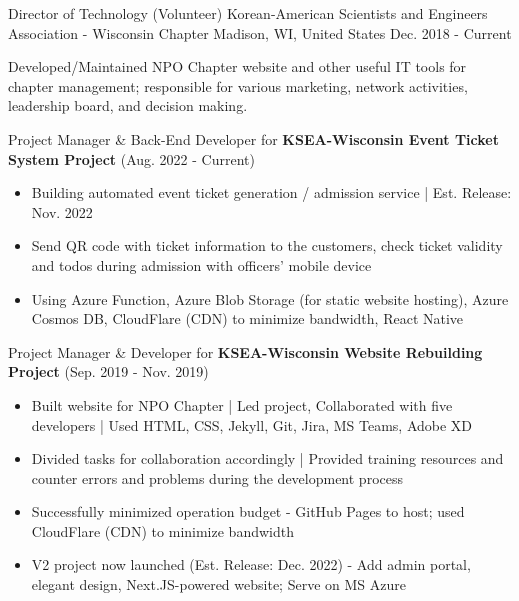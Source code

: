 

\begin{cventries}

  \cventry
  {Director of Technology (Volunteer)} %
  {Korean-American Scientists and Engineers Association - Wisconsin Chapter} %
  {Madison, WI, United States} %
  {Dec. 2018 - Current} %
  {
    \begin{cvitems} %
      \item {Developed/Maintained NPO Chapter website and other useful IT tools for chapter management; responsible for various marketing, network activities, leadership board, and decision making.}
      \item {Project Manager \& Back-End Developer for \textbf{KSEA-Wisconsin Event Ticket System Project} (Aug. 2022 - Current)}
      \begin{itemize}[label={}]
        \setlength{\itemindent}{-20pt}
        \item {Building automated event ticket generation / admission service | Est. Release: Nov. 2022}
        \item {Send QR code with ticket information to the customers, check ticket validity and todos during admission with officers' mobile device}
        \item {Using Azure Function, Azure Blob Storage (for static website hosting), Azure Cosmos DB, CloudFlare (CDN) to minimize bandwidth, React Native}
      \end{itemize}
      \item {Project Manager \& Developer for \textbf{KSEA-Wisconsin Website Rebuilding Project} (Sep. 2019 - Nov. 2019)}
      \begin{itemize}[label={}]
        \setlength{\itemindent}{-20pt}
        \item {Built website for NPO Chapter | Led project, Collaborated with five developers | Used HTML, CSS, Jekyll, Git, Jira, MS Teams, Adobe XD}
        \item {Divided tasks for collaboration accordingly | Provided training resources and counter errors and problems during the development process}
        \item {Successfully minimized operation budget - GitHub Pages to host; used CloudFlare (CDN) to minimize bandwidth}
        \item {V2 project now launched (Est. Release: Dec. 2022) - Add admin portal, elegant design, Next.JS-powered website; Serve on MS Azure}
      \end{itemize}
    \end{cvitems}
  }


\end{cventries}
